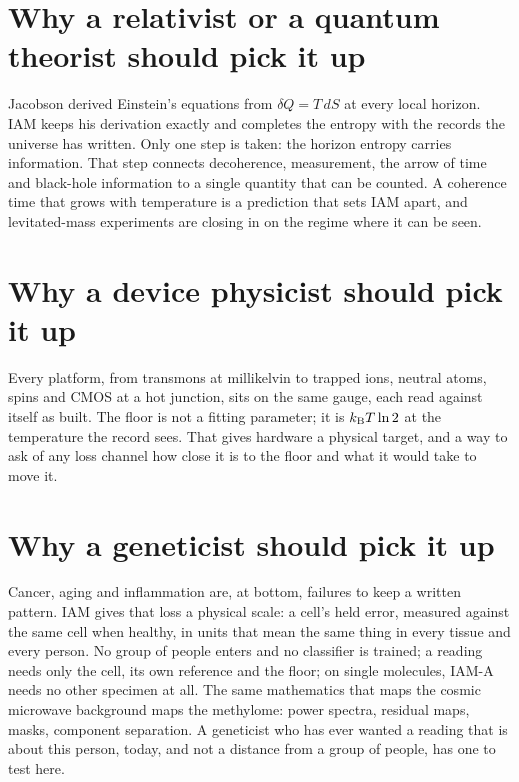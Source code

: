 \section*{Why a relativist or a quantum theorist should pick it up}
Jacobson derived Einstein's equations from $\delta Q=T\,dS$ at every local horizon. IAM keeps his derivation exactly and completes the entropy
with the records the universe has written. Only one step is taken: the horizon entropy carries information. That step connects decoherence,
measurement, the arrow of time and black-hole information to a single quantity that can be counted. A coherence time that grows with temperature
is a prediction that sets IAM apart, and levitated-mass experiments are closing in on the regime where it can be seen. \prediction

\section*{Why a device physicist should pick it up}
Every platform, from transmons at millikelvin to trapped ions, neutral atoms, spins and CMOS at a hot junction, sits on the same gauge, each read
against itself as built. The floor is not a fitting parameter; it is $k_{\mathrm B} T\ln2$ at the temperature the record sees. That gives hardware a
physical target, and a way to ask of any loss channel how close it is to the floor and what it would take to move it. \derived

\section*{Why a geneticist should pick it up}
Cancer, aging and inflammation are, at bottom, failures to keep a written pattern. IAM gives that loss a physical scale: a cell's held error,
measured against the same cell when healthy, in units that mean the same thing in every tissue and every person. No group of people enters and no
classifier is trained; a reading needs only the cell, its own reference and the floor; on single molecules, IAM-A needs no other specimen at all. The same mathematics that maps the cosmic
microwave background maps the methylome: power spectra, residual maps, masks, component separation. A geneticist who has ever wanted a reading
that is about this person, today, and not a distance from a group of people, has one to test here. \interp

